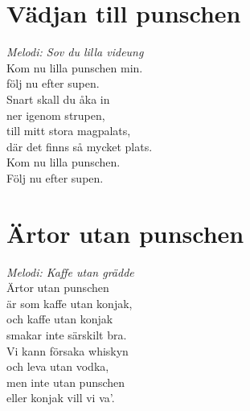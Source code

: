 \newpage
\section{Vädjan till punschen}
\textit{Melodi: Sov du lilla videung}
\vspace{2mm}\\
Kom nu lilla punschen min.\\
följ nu efter supen.\\
Snart skall du åka in\\
ner igenom strupen,\\
till mitt stora magpalats,\\
där det finns så mycket plats.\\
Kom nu lilla punschen.\\
Följ nu efter supen.

\section{Ärtor utan punschen}
\textit{Melodi: Kaffe utan grädde}
\vspace{2mm}\\
Ärtor utan punschen\\
är som kaffe utan konjak,\\
och kaffe utan konjak\\
smakar inte särskilt bra.\\
Vi kann försaka whiskyn\\
och leva utan vodka,\\
men inte utan punschen\\
eller konjak vill vi va'.

\newpage
